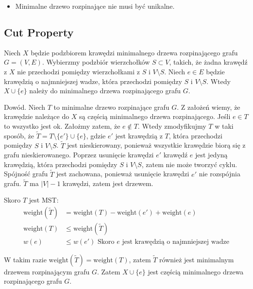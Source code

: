 \documentclass{article}
\numberwithin{equation}{subsection}
\begin{document}
\begin{itemize}
    \item Minimalne drzewo rozpinające nie musi być unikalne.
\end{itemize}

\subsection{Cut Property}

Niech $X$ będzie podzbiorem krawędzi minimalnego drzewa rozpinającego grafu $G=(V,E)$. Wybierzmy podzbiór wierzchołków $S\subset V$,
takich, że żadna krawędź z $X$ nie przechodzi pomiędzy wierzchołkami z $S$ i $V\setminus S$. Niech $e\in E$ będzie krawędzią o najmniejszej
wadze, która przechodzi pomiędzy $S$ i $V\setminus S$. Wtedy $X\cup \{e\}$ należy do minimalnego drzewa rozpinającego grafu $G$.

\noindent 
Dowód. Niech $T$ to minimalne drzewo rozpinające grafu $G$. Z założeń wiemy, że krawędzie należące do $X$ są częścią 
minimalnego drzewa rozpinającego. Jeśli $e\in T$ to wszystko jest ok. Założmy zatem, że $e\notin T$. Wtedy zmodyfikujmy
$T$ w taki sposób, że $\widetilde{T}=T\setminus \{e'\}\cup \{e\}$, gdzie $e'$ jest krawędzią z $T$, która przechodzi pomiędzy $S$ i $V\setminus S$.
$\widetilde{T}$ jest nieskierowany, ponieważ wszystkie krawędzie biorą się z grafu nieskierowanego. Poprzez usunięcie krawędzi $e'$ krawędź $e$ jest jedyną
krawędzią, która przechodzi pomiędzy $S$ i $V\setminus S$, zatem nie może tworzyć cyklu. Spójność grafu $\widetilde{T}$ jest zachowana, ponieważ
usunięcie krawędzi $e'$ nie rozspójnia grafu. $\widetilde{T}$ ma $|V|-1$ krawędzi, zatem jest drzewem.

\noindent
Skoro $T$ jest MST:
\begin{align}
    \text{weight}(\widetilde{T}) &= \text{weight}(T) - \text{weight}(e') + \text{weight}(e) \\
    \text{weight}(T) &\leq \text{weight}(\widetilde{T}) \\
    w(e) &\leq w(e') \text{ Skoro $e$ jest krawędzią o najmniejszej wadze}
\end{align}

W takim razie $\text{weight}(\widetilde{T}) = \text{weight}(T)$, zatem $\widetilde{T}$ również jest minimalnym drzewem rozpinającym grafu $G$.
Zatem $X\cup \{e\}$ jest częścią minimalnego drzewa rozpinającego grafu $G$.
\end{document}

